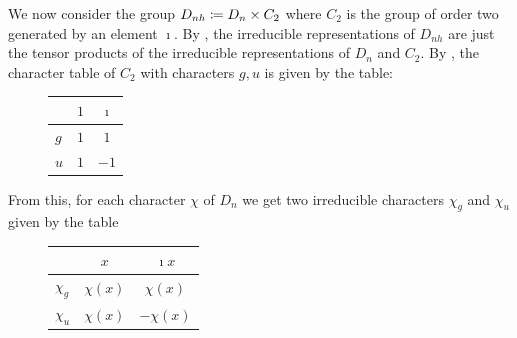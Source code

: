 \documentclass[letterpaper, 11pt, oneside]{book}
\begin{document}
\begin{ex}
  We now consider the group $D_{nh} \coloneqq D_{n} \times C_{2}$ where $C_{2}$ is the group of order two generated by an element $\imath$.
  By , the irreducible representations of $D_{nh}$ are just the tensor products of the irreducible representations of $D_{n}$ and $C_{2}$.
  By , the character table of $C_{2}$ with characters $g, u$ is given by the table:
  \begin{figure}[h]
    \centering
    \begin{tabular}{l|cc}
          & $1$ & $\imath$ \\\hline
      $g$ & $1$ & $1$ \\
      $u$ & $1$ & $-1$
    \end{tabular}
  \end{figure}

  From this, for each character $\chi$ of $D_{n}$ we get two irreducible characters $\chi_{g}$ and $\chi_{u}$ given by the table

  \begin{figure}[h]
    \centering
    \begin{tabular}{l|cc}
                 & $x$ & $\imath x$ \\\hline
      $\chi_{g}$ & $\chi(x)$ & $\chi(x)$ \\
      $\chi_{u}$ & $\chi(x)$ & $-\chi(x)$
    \end{tabular}
  \end{figure}
\end{ex}
\end{document}
